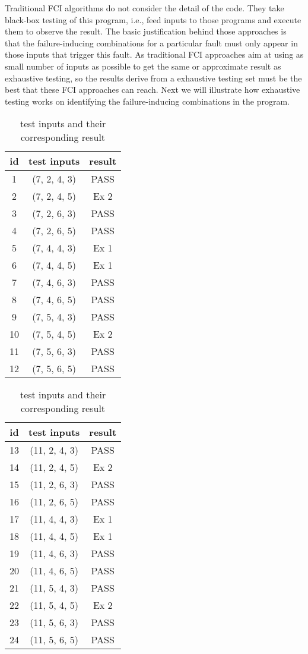 \documentclass{sig-alternate}
\begin{document}
Traditional FCI algorithms do not consider the detail of the code. They take black-box testing of this program, i.e., feed inputs to those programs and execute them to observe the result. The basic justification behind those approaches is that the failure-inducing combinations for a particular fault must only appear in those inputs that trigger this fault. As traditional FCI approaches aim at using as small number of inputs as possible to get the same or approximate result as exhaustive testing, so the results derive from a exhaustive testing set must be the best that these FCI approaches can reach. Next we will illustrate how exhaustive testing works on identifying the failure-inducing combinations in the program.

\begin{table}[!ht]
  \caption{test inputs and their corresponding result}\label{test-example}
  \centering
  \begin{tabular}{ccc}
id&test inputs & result\\\hline
1&(7, 2, 4, 3) &  PASS\\ \hline
2&(7, 2, 4, 5) &  Ex 2\\ \hline
3&(7, 2, 6, 3) &  PASS\\ \hline
4&(7, 2, 6, 5) &  PASS\\ \hline
5&(7, 4, 4, 3) &  Ex 1\\ \hline
6&(7, 4, 4, 5) &  Ex 1\\ \hline
7&(7, 4, 6, 3) &  PASS\\ \hline
8&(7, 4, 6, 5) &  PASS\\ \hline
9&(7, 5, 4, 3) &  PASS\\ \hline
10&(7, 5, 4, 5) &  Ex 2\\ \hline
11&(7, 5, 6, 3) &  PASS\\ \hline
12&(7, 5, 6, 5) &  PASS\\ \hline
  \end{tabular}
  \hspace{1em}
  \begin{tabular}{ccc}
id&test inputs & result\\\hline
13&(11, 2, 4, 3)& PASS\\ \hline
14&(11, 2, 4, 5)& Ex 2\\ \hline
15&(11, 2, 6, 3)& PASS\\ \hline
16&(11, 2, 6, 5)& PASS\\ \hline
17&(11, 4, 4, 3)& Ex 1\\ \hline
18&(11, 4, 4, 5)& Ex 1\\ \hline
19&(11, 4, 6, 3)& PASS\\ \hline
20&(11, 4, 6, 5)& PASS\\ \hline
21&(11, 5, 4, 3)& PASS\\ \hline
22&(11, 5, 4, 5)& Ex 2\\ \hline
23&(11, 5, 6, 3)& PASS\\ \hline
24&(11, 5, 6, 5)& PASS\\ \hline
  \end{tabular}
  \end{table}
\end{document}
